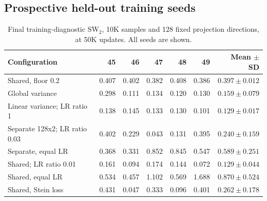 \documentclass[11pt,a4paper]{article}
\begin{document}
\subsection{Prospective held-out training seeds}
\begin{table}[H]\centering\small
\caption{Final training-diagnostic SW$_2$, 10K samples and 128 fixed projection directions, at 50K updates. All seeds are shown.}
\begin{tabular}{@{}>{\raggedright\arraybackslash}p{5cm}rrrrrr@{}}
\toprule
Configuration & 45 & 46 & 47 & 48 & 49 & Mean $\pm$ SD \\ \midrule
Shared, floor 0.2 & 0.407 & 0.402 & 0.382 & 0.408 & 0.386 & $0.397\pm0.012$ \\
Global variance & 0.298 & 0.111 & 0.134 & 0.120 & 0.130 & $0.159\pm0.079$ \\
Linear variance; LR ratio 1 & 0.138 & 0.145 & 0.133 & 0.130 & 0.101 & $0.129\pm0.017$ \\
Separate 128x2; LR ratio 0.03 & 0.402 & 0.229 & 0.043 & 0.131 & 0.395 & $0.240\pm0.159$ \\
Separate, equal LR & 0.368 & 0.331 & 0.852 & 0.845 & 0.547 & $0.589\pm0.251$ \\
Shared; LR ratio 0.01 & 0.161 & 0.094 & 0.174 & 0.144 & 0.072 & $0.129\pm0.044$ \\
Shared, equal LR & 0.534 & 0.457 & 1.102 & 0.569 & 1.688 & $0.870\pm0.524$ \\
Shared, Stein loss & 0.431 & 0.047 & 0.333 & 0.096 & 0.401 & $0.262\pm0.178$ \\
\bottomrule\end{tabular}\end{table}
\end{document}
